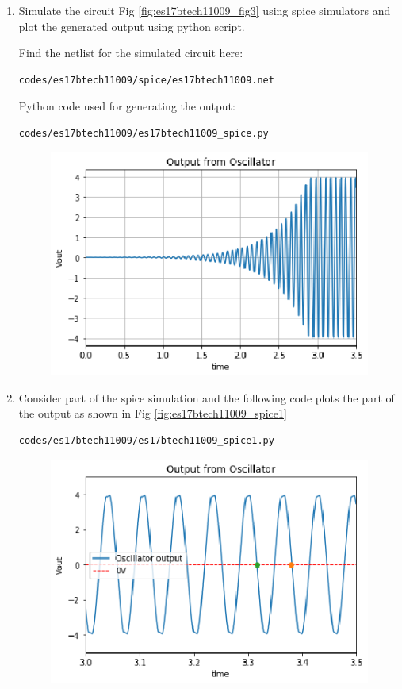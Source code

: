 \begin{enumerate}[label=\arabic*.,ref=\theenumi]
\item
Simulate the circuit Fig \ref{fig:es17btech11009_fig3} using spice simulators and plot the generated output using python script.

Find the netlist for the simulated circuit here:
\begin{lstlisting}
codes/es17btech11009/spice/es17btech11009.net
\end{lstlisting}
Python code used for generating the output:
\begin{lstlisting}
codes/es17btech11009/es17btech11009_spice.py
\end{lstlisting}
\begin{figure}[!ht]
\centering
\includegraphics[width=\columnwidth]{./figs/es17btech11009/es17btech11009_spice.eps}
\caption{}
\label{fig:es17btech11009_spice}
\end{figure}
\item
Consider part of the spice simulation and the following code plots the part of the output as shown in Fig \ref{fig:es17btech11009_spice1}
\begin{lstlisting}
codes/es17btech11009/es17btech11009_spice1.py
\end{lstlisting}
\begin{figure}[!ht]
\centering
\includegraphics[width=\columnwidth]{./figs/es17btech11009/es17btech11009_spice1.eps}

\end{figure}
\end{enumerate}
